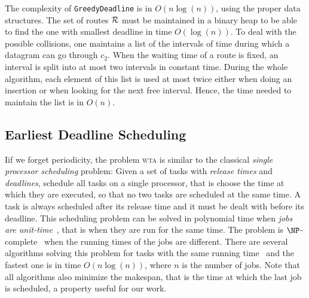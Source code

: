 \documentclass[a4paper,10pt]{journal}
\newcommand\greedydeadline{\texttt{GreedyDeadline}\xspace}
\newcommand\wta{\textsc{wta}\xspace}
\begin{document}
      

   


    The complexity of \greedydeadline is in $O(n\log(n))$, using the proper data structures. The set of routes $\cal{R}$ must be maintained in a binary heap to be able to find the one with smallest deadline in time $O(\log(n))$. To deal with the possible collisions, one maintains a list of the intervals
    of time during which a datagram can go through $c_2$. When the waiting time of a route is fixed, an interval is split into at most two intervals in constant time. During the whole algorithm, each element of this list is used at most twice either when doing an insertion or when looking for the next free interval. Hence, the time needed to maintain the list is in $O(n)$. 
  
     \subsection{Earliest Deadline Scheduling}\label{sec:wtaheuristic}
     
     
     Iif we forget periodicity, the problem \wta is similar to the classical \emph{single processor scheduling} problem: Given a set of tasks with \emph{release times} and \emph{deadlines}, schedule all tasks on a single processor, that is choose the time at which they are executed, so that no two tasks are scheduled at the same time. A task is always scheduled after its release time and it must be dealt with before its deadline. This scheduling problem can be solved in polynomial time when \emph{jobs are unit-time}~\cite{simons1978fast}, that is when they are run for the same time.
     The problem is $\NP$-complete~\cite{lenstra1977complexity} when the running times of the jobs are different. There are several algorithms solving this problem
     for tasks with the same running time~\cite{simons1978fast,carlier1979probleme,garey1981scheduling} and the fastest one is in time $O(n\log(n))$, where $n$ is the number of jobs.
     Note that all algorithms also minimize the makespan, that is the time at which the last job is scheduled, a property useful for our work. 
\end{document}
